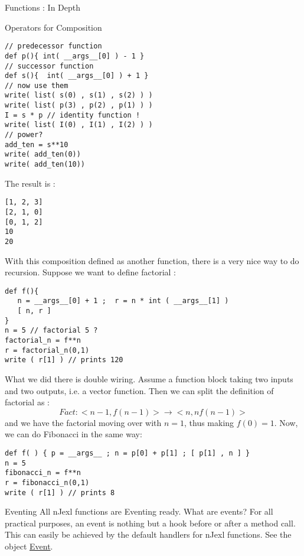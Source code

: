 \begin{section}{Functions : In Depth}
\begin{subsection}{Operators for Composition}
\begin{center}\begin{minipage}{\linewidth}
\begin{lstlisting}[style=JexlStyle]
// predecessor function 
def p(){ int( __args__[0] ) - 1 }
// successor function 
def s(){  int( __args__[0] ) + 1 }
// now use them 
write( list( s(0) , s(1) , s(2) ) )
write( list( p(3) , p(2) , p(1) ) )
I = s * p // identity function !
write( list( I(0) , I(1) , I(2) ) )
// power?
add_ten = s**10 
write( add_ten(0))
write( add_ten(10))
\end{lstlisting}
\end{minipage}\end{center}

The result is :
\begin{lstlisting}[style=all]
[1, 2, 3]
[2, 1, 0]
[0, 1, 2]
10
20
\end{lstlisting}

With this composition defined as another function, 
there is a very nice way to do recursion.
Suppose we want to define factorial :

\begin{lstlisting}[style=JexlStyle]
def f(){ 
   n = __args__[0] + 1 ;  r = n * int ( __args__[1] )  
   [ n, r ] 
}
n = 5 // factorial 5 ?
factorial_n = f**n 
r = factorial_n(0,1)
write ( r[1] ) // prints 120
\end{lstlisting}
What we did there is double wiring. Assume a function block taking
two inputs and two outputs, i.e. a vector function. 
Then we can split the definition of factorial as :
$$
Fact : < n-1, f(n-1) > \to < n , n f(n-1) >
$$
and we have the factorial moving over with $n=1$, thus making $f(0) = 1$.
Now, we can do Fibonacci in the same way:
\begin{lstlisting}[style=JexlStyle]
def f( ) { p = __args__ ; n = p[0] + p[1] ; [ p[1] , n ] }
n = 5 
fibonacci_n = f**n 
r = fibonacci_n(0,1)
write ( r[1] ) // prints 8 
\end{lstlisting}


\end{subsection}

\begin{subsection}{Eventing}
All nJexl functions are Eventing ready.
What are events? For all practical purposes, 
an event is nothing but a hook before or after a method call.
This can easily be achieved by the default handlers for nJexl functions.
See the object  
\href{https://github.com/nmondal/njexl/blob/master/lang/src/main/java/com/noga/njexl/lang/extension/oop/ScriptClassBehaviour.java}{Event}.


\end{subsection}
\end{section}
